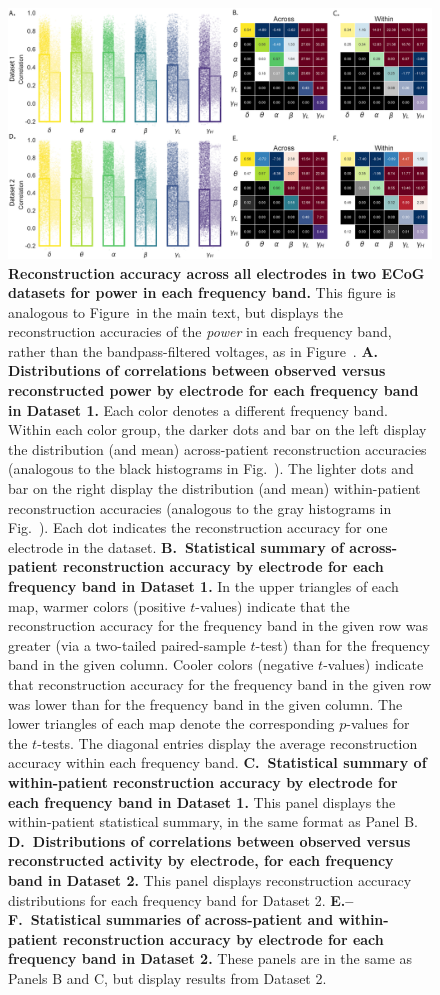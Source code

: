 \documentclass[10pt]{article}
\begin{document}
\begin{figure}[p]
\centering
\includegraphics[width=\textwidth]{figs/supplemental_4}
\caption{\textbf{Reconstruction accuracy across all electrodes in two ECoG
datasets for power in each frequency band.} This figure is analogous to
Figure~\freqs in the main text, but displays the reconstruction accuracies of
the \textit{power} in each frequency band, rather than the bandpass-filtered
voltages, as in Figure~\freqs. \textbf{A. Distributions of correlations between
observed versus reconstructed power by electrode for each frequency band in
Dataset 1.}  Each color denotes a different frequency band. Within each color
group, the darker dots and bar on the left display the distribution (and mean)
across-patient reconstruction accuracies (analogous to the black histograms in
Fig.~\corrmaps).  The lighter dots and bar on the right display the distribution
(and mean) within-patient reconstruction accuracies (analogous to the gray
histograms in Fig.~\corrmaps). Each dot indicates the reconstruction accuracy
for one electrode in the dataset. \textbf{B.~Statistical summary of
across-patient reconstruction accuracy by electrode for each frequency band in
Dataset 1.} In the upper triangles of each map, warmer colors (positive
$t$-values) indicate that the reconstruction accuracy for the frequency band in
the given row was greater (via a two-tailed paired-sample $t$-test) than for the
frequency band in the given column. Cooler colors (negative $t$-values) indicate
that reconstruction accuracy for the frequency band in the given row was lower
than for the frequency band in the given column. The lower triangles of each map
denote the corresponding $p$-values for the $t$-tests. The diagonal entries
display the average reconstruction accuracy within each frequency band.
\textbf{C.~Statistical summary of within-patient reconstruction accuracy by
electrode for each frequency band in Dataset 1.} This panel displays the
within-patient statistical summary, in the same format as Panel B.
\textbf{D.~Distributions of correlations between observed versus reconstructed
activity by electrode, for each frequency band in Dataset 2.} This panel
displays reconstruction accuracy distributions for each frequency band for
Dataset 2. \textbf{E.--F.~Statistical summaries of across-patient and
within-patient reconstruction accuracy by electrode for each frequency band in
Dataset 2.} These panels are in the same as Panels B and C, but display results
from Dataset 2.}
\label{fig:supplemental_4}
\end{figure}
\end{document}
